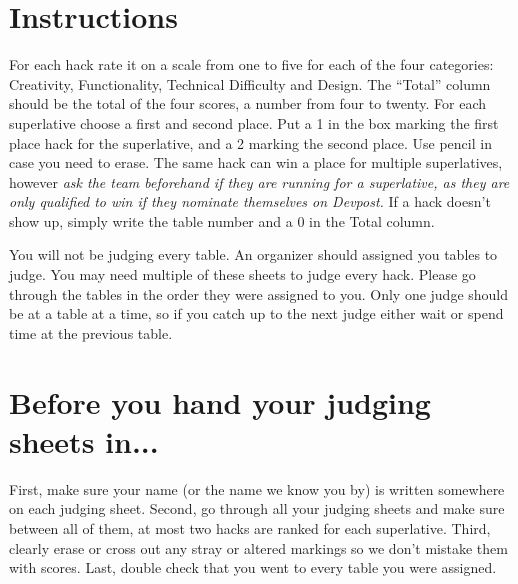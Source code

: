 \documentclass{article}
\begin{document}

\section{Instructions}

For each hack rate it on a scale from one to five for each of the four
categories: Creativity, Functionality, Technical Difficulty and Design. The
``Total'' column should be the total of the four scores, a number from four to
twenty. For each superlative choose a first and second place. Put a 1 in the box
marking the first place hack for the superlative, and a 2 marking the second
place. Use pencil in case you need to erase. The same hack can win a place for
multiple superlatives, however \textit{ask the team beforehand if they are
running for a superlative, as they are only qualified to win if they nominate
themselves on Devpost.} If a hack doesn't show up, simply write the table number
and a 0 in the Total column.

You will not be judging every table. An organizer should assigned you tables to
judge. You may need multiple of these sheets to judge every hack. Please go
through the tables in the order they were assigned to you. Only one judge should
be at a table at a time, so if you catch up to the next judge either wait or
spend time at the previous table.

\section{Before you hand your judging sheets in...}

First, make sure your name (or the name we know you by) is written somewhere on
each judging sheet. Second, go through all your judging sheets and make sure
between all of them, at most two hacks are ranked for each superlative. Third,
clearly erase or cross out any stray or altered markings so we don't mistake
them with scores. Last, double check that you went to every table you were
assigned.

\newcommand{\judgerow}{
  \parbox[][1cm]{0cm}{} &
    \parbox[c][1cm]{1cm}{\ } &
    \parbox[c][1cm]{1cm}{\ } &
    \parbox[c][1cm]{1cm}{\ } &
    \parbox[c][1cm]{1cm}{\ } &
    \parbox[c][1cm]{1cm}{\ } &
    &
    \parbox[c][1cm]{1cm}{\ } &
    \parbox[c][1cm]{1cm}{\ } &
    \parbox[c][1cm]{1cm}{\ } &
    \parbox[c][1cm]{1cm}{\ } &
    \parbox[c][1cm]{1cm}{\ } &
    \parbox[c][1cm]{1cm}{\ }
}
\end{document}
